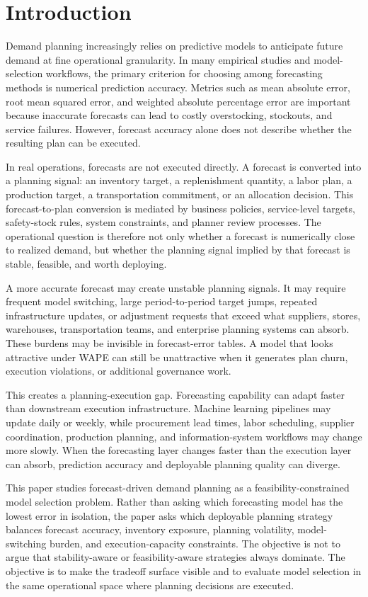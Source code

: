 \section{Introduction}

Demand planning increasingly relies on predictive models to anticipate future demand at fine operational granularity. In many empirical studies and model-selection workflows, the primary criterion for choosing among forecasting methods is numerical prediction accuracy. Metrics such as mean absolute error, root mean squared error, and weighted absolute percentage error are important because inaccurate forecasts can lead to costly overstocking, stockouts, and service failures. However, forecast accuracy alone does not describe whether the resulting plan can be executed.

In real operations, forecasts are not executed directly. A forecast is converted into a planning signal: an inventory target, a replenishment quantity, a labor plan, a production target, a transportation commitment, or an allocation decision. This forecast-to-plan conversion is mediated by business policies, service-level targets, safety-stock rules, system constraints, and planner review processes. The operational question is therefore not only whether a forecast is numerically close to realized demand, but whether the planning signal implied by that forecast is stable, feasible, and worth deploying.

A more accurate forecast may create unstable planning signals. It may require frequent model switching, large period-to-period target jumps, repeated infrastructure updates, or adjustment requests that exceed what suppliers, stores, warehouses, transportation teams, and enterprise planning systems can absorb. These burdens may be invisible in forecast-error tables. A model that looks attractive under WAPE can still be unattractive when it generates plan churn, execution violations, or additional governance work.

This creates a planning-execution gap. Forecasting capability can adapt faster than downstream execution infrastructure. Machine learning pipelines may update daily or weekly, while procurement lead times, labor scheduling, supplier coordination, production planning, and information-system workflows may change more slowly. When the forecasting layer changes faster than the execution layer can absorb, prediction accuracy and deployable planning quality can diverge.

This paper studies forecast-driven demand planning as a feasibility-constrained model selection problem. Rather than asking which forecasting model has the lowest error in isolation, the paper asks which deployable planning strategy balances forecast accuracy, inventory exposure, planning volatility, model-switching burden, and execution-capacity constraints. The objective is not to argue that stability-aware or feasibility-aware strategies always dominate. The objective is to make the tradeoff surface visible and to evaluate model selection in the same operational space where planning decisions are executed.

